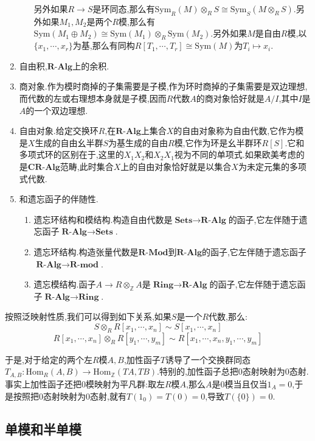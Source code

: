 \begin{enumerate}
\begin{enumerate}
		另外如果$R\to S$是环同态,那么有$\mathrm{Sym}_R(M)\otimes_RS\cong\mathrm{Sym}_S(M\otimes_RS)$.另外如果$M_1,M_2$是两个$R$模,那么有$\mathrm{Sym}(M_1\oplus M_2)\cong\mathrm{Sym}(M_1)\otimes_R\mathrm{Sym}(M_2)$.另外如果$M$是自由$R$模,以$\{x_1,\cdots,x_r\}$为基,那么有同构$R[T_1,\cdots,T_r]\cong\mathrm{Sym}(M)$为$T_i\mapsto x_i$.
	\end{enumerate}
	\item 自由积,$\textbf{R-Alg}$上的余积.
	\item 商对象.作为模时商掉的子集需要是子模,作为环时商掉的子集需要是双边理想,而代数的左或右理想本身就是子模,因而$R$代数$A$的商对象恰好就是$A/I$,其中$I$是$A$的一个双边理想.
	\item 自由对象.给定交换环$R$,在$\textbf{R-Alg}$上集合$X$的自由对象称为自由代数,它作为模是$X$生成的自由幺半群$S$为基生成的自由$R$模,它作为环是幺半群环$R[S]$.它和多项式环的区别在于,这里的$X_1X_2$和$X_2X_1$视为不同的单项式.如果欧美考虑的是$\textbf{CR-Alg}$范畴,此时集合$X$上的自由对象恰好就是以集合$X$为未定元集的多项式代数.
	\item 和遗忘函子的伴随性.
	\begin{enumerate}
		\item 遗忘环结构和模结构.构造自由代数是$\textbf{Sets}\to\textbf{R-Alg}$的函子,它左伴随于遗忘函子$\textbf{R-Alg}\to\textbf{Sets}$.
		\item 遗忘环结构.构造张量代数是$\textbf{R-Mod}$到$\textbf{R-Alg}$的函子,它左伴随于遗忘函子$\textbf{R-Alg}\to\textbf{R-mod}$.
		\item 遗忘模结构.函子$A\to R\otimes_{\mathbb{Z}}A$是$\textbf{Ring}\to\textbf{R-Alg}$的函子,它左伴随于遗忘函子$\textbf{R-Alg}\to\textbf{Ring}$.
	\end{enumerate}
\end{enumerate}


按照泛映射性质,我们可以得到如下关系,如果$S$是一个$R$代数,那么:
$$S\otimes_RR[x_1,\cdots,x_n]\sim S[x_1,\cdots,x_n]$$
$$R[x_1,\cdots,x_n]\otimes_RR[y_1,\cdots,y_m]\sim R[x_1,\cdots,x_n,y_1,\cdots,y_m]$$







于是,对于给定的两个左$R$模$A,B$,加性函子$T$诱导了一个交换群同态$T_{A,B}:\mathrm{Hom}_R(A,B)\to\mathrm{Hom}_{\mathbb{Z}}(TA,TB)$.特别的,加性函子总把0态射映射为0态射.事实上加性函子还把0模映射为平凡群:取左$R$模$A$,那么$A$是0模当且仅当$1_A=0$,于是按照把0态射映射为0态射,就有$T(1_{0})=T(0)=0$,导致$T(\{0\})=0$.

\newpage
\subsection{单模和半单模}

